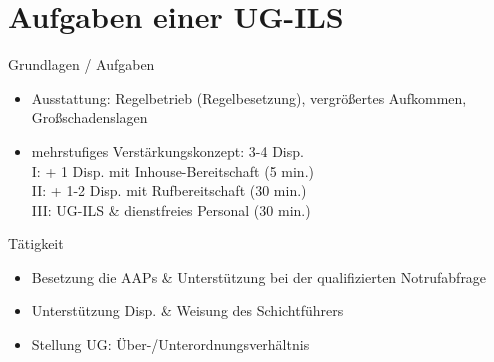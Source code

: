\section{Aufgaben einer UG-ILS}
\begin{sectionbox}{Grundlagen / Aufgaben}
    \begin{itemize}
        \item Ausstattung: Regelbetrieb (Regelbesetzung), vergrößertes Aufkommen, Großschadenslagen
        \item mehrstufiges Verstärkungskonzept: 3-4 Disp.\\
        \ra I: + 1 Disp. mit Inhouse-Bereitschaft (5 min.)\\
        \ra II: + 1-2 Disp. mit Rufbereitschaft (30 min.)\\
        \ra III: UG-ILS \& dienstfreies Personal (30 min.)
    \end{itemize}
\end{sectionbox}
\begin{sectionbox}{Tätigkeit}
    \begin{itemize}
        \item Besetzung die AAPs \& Unterstützung bei der qualifizierten Notrufabfrage
        \item Unterstützung Disp. \& Weisung des Schichtführers
        \item Stellung UG: Über-/Unterordnungsverhältnis
    \end{itemize}
\end{sectionbox}
